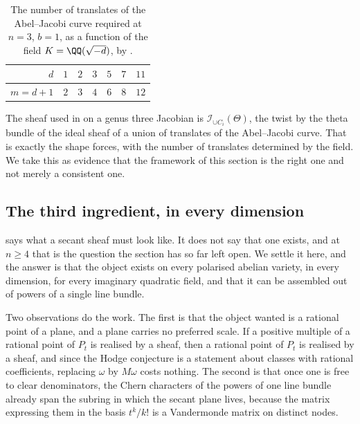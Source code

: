 \begin{table}[htbp]
\centering
\renewcommand{\arraystretch}{1.15}
\begin{tabular}{@{}rrrrrrr@{}}
\toprule
$d$ & $1$ & $2$ & $3$ & $5$ & $7$ & $11$ \\
\midrule
$m=d+1$ & $2$ & $3$ & $4$ & $6$ & $8$ & $12$ \\
\bottomrule
\end{tabular}
\caption{The number of translates of the Abel--Jacobi curve required at
$n=3$, $b=1$, as a function of the field $K=\QQ(\sqrt{-d})$, by
.}
\label{tab:translates}
\end{table}

\begin{remark}\label{rem:markmancheck}
The sheaf used in \cite{Mar25b} on a genus three Jacobian is
$\mathcal{I}_{\cup C_{i}}(\Theta)$, the twist by the theta bundle of the ideal
sheaf of a union of translates of the Abel--Jacobi curve. That is exactly the
shape  forces, with the number of translates determined by
the field. We take this as evidence that the framework of this section is the
right one and not merely a consistent one.
\end{remark}

\subsection{The third ingredient, in every dimension}\label{ssec:thirdexists}

 says what a secant sheaf must look like. It does
not say that one exists, and at $n\ge4$ that is the question the section has so
far left open. We settle it here, and the answer is that the object exists on
every polarised abelian variety, in every dimension, for every imaginary
quadratic field, and that it can be assembled out of powers of a single line
bundle.

Two observations do the work. The first is that the object wanted is a
rational point of a plane, and a plane carries no preferred scale. If a
positive multiple of a rational point of $P_{t}$ is realised by a sheaf, then a
rational point of $P_{t}$ is realised by a sheaf, and since the Hodge
conjecture is a statement about classes with rational coefficients, replacing
$\omega$ by $M\omega$ costs nothing. The second is that once one is free to
clear denominators, the Chern characters of the powers of one line bundle
already span the subring in which the secant plane lives, because the matrix
expressing them in the basis $t^{k}/k!$ is a Vandermonde matrix on distinct
nodes.

